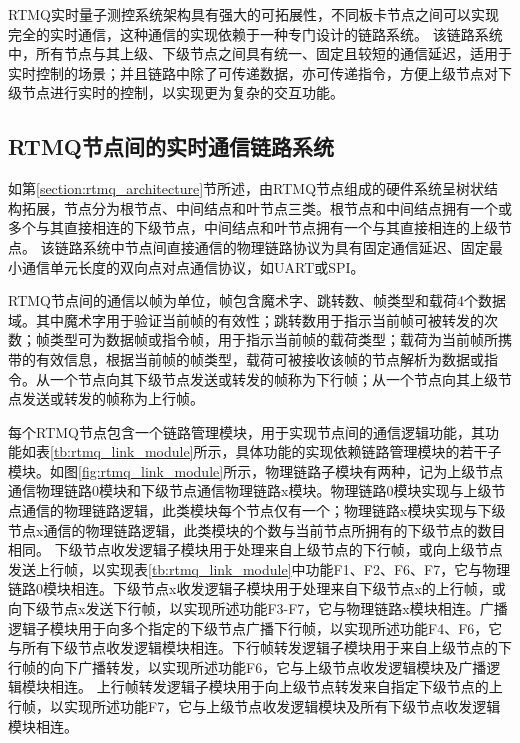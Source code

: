 RTMQ实时量子测控系统架构具有强大的可拓展性，不同板卡节点之间可以实现完全的实时通信，这种通信的实现依赖于一种专门设计的链路系统。
该链路系统中，所有节点与其上级、下级节点之间具有统一、固定且较短的通信延迟，适用于实时控制的场景；并且链路中除了可传递数据，亦可传递指令，方便上级节点对下级节点进行实时的控制，以实现更为复杂的交互功能。

\subsection[RTMQ节点间的实时通信链路系统]{RTMQ节点间的实时通信链路系统}
如第\ref{section:rtmq_architecture}节所述，由RTMQ节点组成的硬件系统呈树状结构拓展，节点分为根节点、中间结点和叶节点三类。根节点和中间结点拥有一个或多个与其直接相连的下级节点，中间结点和叶节点拥有一个与其直接相连的上级节点。
该链路系统中节点间直接通信的物理链路协议为具有固定通信延迟、固定最小通信单元长度的双向点对点通信协议，如UART或SPI。

RTMQ节点间的通信以帧为单位，帧包含魔术字、跳转数、帧类型和载荷4个数据域。其中魔术字用于验证当前帧的有效性；跳转数用于指示当前帧可被转发的次数；帧类型可为数据帧或指令帧，用于指示当前帧的载荷类型；载荷为当前帧所携带的有效信息，根据当前帧的帧类型，载荷可被接收该帧的节点解析为数据或指令。从一个节点向其下级节点发送或转发的帧称为下行帧；从一个节点向其上级节点发送或转发的帧称为上行帧。

每个RTMQ节点包含一个链路管理模块，用于实现节点间的通信逻辑功能，其功能如表\ref{tb:rtmq_link_module}所示，具体功能的实现依赖链路管理模块的若干子模块。如图\ref{fig:rtmq_link_module}所示，物理链路子模块有两种，记为上级节点通信物理链路0模块和下级节点通信物理链路x模块。物理链路0模块实现与上级节点通信的物理链路逻辑，此类模块每个节点仅有一个；物理链路x模块实现与下级节点x通信的物理链路逻辑，此类模块的个数与当前节点所拥有的下级节点的数目相同。
下级节点收发逻辑子模块用于处理来自上级节点的下行帧，或向上级节点发送上行帧，以实现表\ref{tb:rtmq_link_module}中功能F1、F2、F6、F7，它与物理链路0模块相连。下级节点x收发逻辑子模块用于处理来自下级节点x的上行帧，或向下级节点x发送下行帧，以实现所述功能F3-F7，它与物理链路x模块相连。广播逻辑子模块用于向多个指定的下级节点广播下行帧，以实现所述功能F4、F6，它与所有下级节点收发逻辑模块相连。下行帧转发逻辑子模块用于来自上级节点的下行帧的向下广播转发，以实现所述功能F6，它与上级节点收发逻辑模块及广播逻辑模块相连。
上行帧转发逻辑子模块用于向上级节点转发来自指定下级节点的上行帧，以实现所述功能F7，它与上级节点收发逻辑模块及所有下级节点收发逻辑模块相连。


